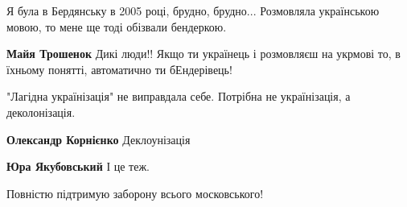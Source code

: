 \begin{itemize}
\begin{itemize}
 
Я була в Бердянську в 2005 році, брудно, брудно... Розмовляла українською мовою, то мене ще тоді обізвали бендеркою.

 
\textbf{Майя Трошенок} Дикі люди!! Якщо ти українець і розмовляєш на укрмові то, в їхньому понятті, автоматично ти бЕндерівець!
\end{itemize}

 
"Лагідна українізація" не виправдала себе. Потрібна не українізація, а деколонізація.

\begin{itemize}
 
\textbf{Олександр Корнієнко} Деклоунізація

 
\textbf{Юра Якубовський} І це теж.
\end{itemize}

 
Повністю підтримую заборону всього московського!


\end{itemize}
